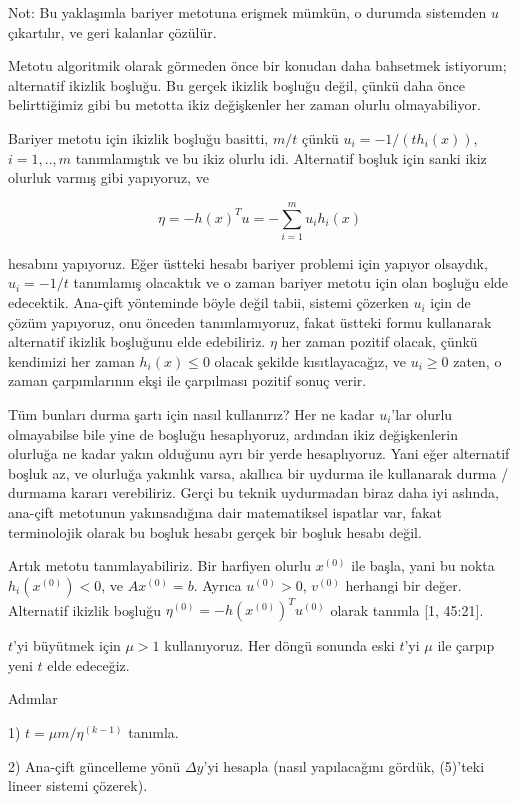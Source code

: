 \documentclass[12pt,fleqn]{article}\usepackage{../../common}
\begin{document}
Not: Bu yaklaşımla bariyer metotuna erişmek mümkün, o durumda sistemden $u$
çıkartılır, ve geri kalanlar çözülür. 

Metotu algoritmik olarak görmeden önce bir konudan daha bahsetmek
istiyorum; alternatif ikizlik boşluğu. Bu gerçek ikizlik boşluğu değil,
çünkü daha önce belirttiğimiz gibi bu metotta ikiz değişkenler her zaman
olurlu olmayabiliyor.

Bariyer metotu için ikizlik boşluğu basitti, $m/t$ çünkü
$u_i = -1 / (t h_i(x))$, $i=1,..,m$ tanımlamıştık ve bu ikiz olurlu idi.
Alternatif boşluk için sanki ikiz olurluk varmış gibi yapıyoruz, ve 

$$
\eta = -h(x)^T u = - \sum_{i=1}^{m} u_i h_i(x)
$$

hesabını yapıyoruz. Eğer üstteki hesabı bariyer problemi için yapıyor
olsaydık, $u_i = -1/t$ tanımlamış olacaktık ve o zaman bariyer metotu için
olan boşluğu elde edecektik. Ana-çift yönteminde böyle değil tabii, sistemi
çözerken $u_i$ için de çözüm yapıyoruz, onu önceden tanımlamıyoruz, fakat
üstteki formu kullanarak alternatif ikizlik boşluğunu elde edebiliriz.  
$\eta$ her zaman pozitif olacak, çünkü kendimizi her zaman $h_i(x) \le 0$
olacak şekilde kısıtlayacağız, ve $u_i \ge 0$ zaten, o zaman çarpımlarının
ekşi ile çarpılması pozitif sonuç verir.

Tüm bunları durma şartı için nasıl kullanırız? Her ne kadar $u_i$'lar
olurlu olmayabilse bile yine de boşluğu hesaplıyoruz, ardından ikiz
değişkenlerin olurluğa ne kadar yakın olduğunu ayrı bir yerde
hesaplıyoruz. Yani eğer alternatif boşluk az, ve olurluğa yakınlık varsa,
akıllıca bir uydurma ile kullanarak durma / durmama kararı verebiliriz.
Gerçi bu teknik uydurmadan biraz daha iyi aslında, ana-çift metotunun
yakınsadığına dair matematiksel ispatlar var, fakat terminolojik olarak bu
boşluk hesabı gerçek bir boşluk hesabı değil.

Artık metotu tanımlayabiliriz. Bir harfiyen olurlu $x^{(0)}$ ile başla,
yani bu nokta $h_i(x^{(0)}) < 0 $, ve $A x^{(0)}= b$. Ayrıca $u^{(0)} > 0$,
$v^{(0)}$ herhangi bir değer. Alternatif ikizlik boşluğu
$\eta^{(0)} = -h(x^{(0)})^T u^{(0)}$ olarak tanımla [1, 45:21].

$t$'yi büyütmek için $\mu > 1$ kullanıyoruz. Her döngü sonunda eski $t$'yi
$\mu$ ile çarpıp yeni $t$ elde edeceğiz.  

Adımlar

1) $t = \mu m / \eta^{(k-1)}$ tanımla. 

2) Ana-çift güncelleme yönü $\Delta y$'yi hesapla (nasıl yapılacağını
gördük, (5)'teki lineer sistemi çözerek).
\end{document}
